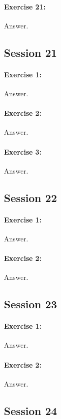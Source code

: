 \documentclass{article}
\begin{document}
\paragraph{Exercise 21:}
Answer.
\newpage

\subsection*{Session 21}
\paragraph{Exercise 1:}
Answer.
\paragraph{Exercise 2:}
Answer.
\paragraph{Exercise 3:}
Answer.
\newpage

\subsection*{Session 22}
\paragraph{Exercise 1:}
Answer.
\paragraph{Exercise 2:}
Answer.
\newpage

\subsection*{Session 23}
\paragraph{Exercise 1:}
Answer.
\paragraph{Exercise 2:}
Answer.
\newpage

\subsection*{Session 24}
\end{document}
